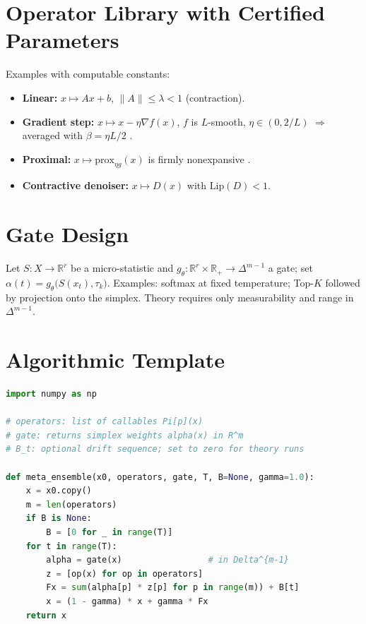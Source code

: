 \documentclass[11pt]{article}
\theoremstyle{definition}
\newcommand{\R}{\mathbb{R}}
\newcommand{\simplex}{\Delta}
\begin{document}
\section{Operator Library with Certified Parameters}
Examples with computable constants:
\begin{itemize}[leftmargin=*]
  \item \textbf{Linear:} $x\mapsto Ax+b$, $\lVert A\rVert\le \lambda<1$ (contraction).
  \item \textbf{Gradient step:} $x\mapsto x-\eta\nabla f(x)$, $f$ is $L$-smooth, $\eta\in(0,2/L)$ $\Rightarrow$ averaged with $\beta=\eta L/2$ \cite[Ex.~4.38]{BauschkeCombettes2017}.
  \item \textbf{Proximal:} $x\mapsto \mathrm{prox}_{\eta g}(x)$ is firmly nonexpansive \cite{ParikhBoyd2014}.
  \item \textbf{Contractive denoiser:} $x\mapsto D(x)$ with $\mathrm{Lip}(D)<1$.
\end{itemize}

\section{Gate Design}
Let $S:X\to\R^r$ be a micro-statistic and $g_\theta: \R^r\times\R_+\to \simplex^{m-1}$ a gate; set $\alpha(t)=g_\theta\big(S(x_t),\tau_k\big)$. Examples: softmax at fixed temperature; Top-$K$ followed by projection onto the simplex. Theory requires only measurability and range in $\simplex^{m-1}$.

\section{Algorithmic Template}
\begin{lstlisting}[style=code,language=Python,caption={Core Meta-Ensemble Loop (NumPy/PyTorch-like pseudocode)}]
import numpy as np

# operators: list of callables Pi[p](x)
# gate: returns simplex weights alpha(x) in R^m
# B_t: optional drift sequence; set to zero for theory runs

def meta_ensemble(x0, operators, gate, T, B=None, gamma=1.0):
    x = x0.copy()
    m = len(operators)
    if B is None:
        B = [0 for _ in range(T)]
    for t in range(T):
        alpha = gate(x)                 # in Delta^{m-1}
        z = [op(x) for op in operators]
        Fx = sum(alpha[p] * z[p] for p in range(m)) + B[t]
        x = (1 - gamma) * x + gamma * Fx
    return x
\end{lstlisting}
\end{document}
